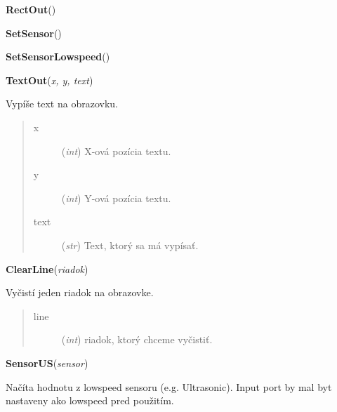 \documentclass[10pt,a4paper]{article}
\begin{document}
 

\vspace{6pt}
{\bf RectOut}({\it }) 

 

\vspace{6pt}
{\bf SetSensor}({\it }) 

 

\vspace{6pt}
{\bf SetSensorLowspeed}({\it }) 

 

\vspace{6pt}
{\bf TextOut}({\it x, y, text}) 
    
    Vypíše text na obrazovku.
    



    

\begin{quote}
    \begin{description}
        
\item[x] ({\emph{int}}) X-ová pozícia textu.

\item[y] ({\emph{int}}) Y-ová pozícia textu.

\item[text] ({\emph{str}}) Text, ktorý sa má vypísať.

    \end{description}
\end{quote}

 

\vspace{6pt}
{\bf ClearLine}({\it riadok}) 
    
    Vyčistí jeden riadok na obrazovke.
    

    

\begin{quote}
    \begin{description}
        
\item[line] ({\emph{int}}) riadok, ktorý chceme vyčistiť.

    \end{description}
\end{quote}

 

\vspace{6pt}
{\bf SensorUS}({\it sensor}) 

    Načíta hodnotu z lowspeed sensoru (e.g. Ultrasonic). Input port
    by mal byt nastaveny ako lowspeed pred použitím.
    
\end{document}
